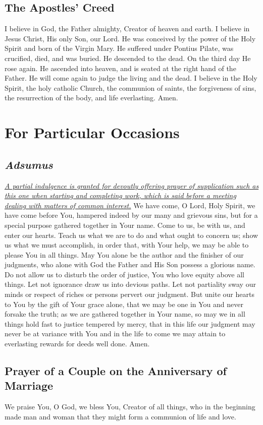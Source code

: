 \documentclass[12pt]{article}
\newcommand{\prayersection}[1]{\section{#1}}
\newcommand{\prayertitle}[1]{\subsection{#1}}
\newcommand{\indulgencedprayertitle}[1]{\prayertitle{#1 \protect\kreuz}}
\newcommand{\foreign}[1]{\textsl{#1}}
\newcommand{\note}[1]{{\small{\textsl{#1}}}\newline}
\newcommand{\linkednote}[2]{\hyperlink{#1}{\note{#2}}}
\begin{document}
\indulgencedprayertitle{The Apostles' Creed}
I believe in God, the Father almighty, Creator of heaven and earth.
I believe in Jesus Christ, His only Son, our Lord.
He was conceived by the power of the Holy Spirit and born of the Virgin Mary.
He suffered under Pontius Pilate, was crucified, died, and was buried.
He descended to the dead.
On the third day He rose again.
He ascended into heaven, and is seated at the right hand of the Father.
He will come again to judge the living and the dead.
I believe in the Holy Spirit, the holy catholic Church, the communion of saints, the forgiveness of sins, the resurrection of the body, and life everlasting.
Amen.

\newpage


\prayersection{For Particular Occasions}
\indulgencedprayertitle{\foreign{Adsumus}}
\linkednote{grant26}{A partial indulgence is granted for devoutly offering prayer of supplication such as this one when starting and completing work, which is said before a meeting dealing with matters of common interest.}
We have come, O Lord, Holy Spirit, we have come before You, hampered indeed by our many and grievous sins, but for a special purpose gathered together in Your name.
Come to us, be with us, and enter our hearts.
Teach us what we are to do and what ought to concern us;
show us what we must accomplish, in order that, with Your help, we may be able to please You in all things.
May You alone be the author and the finisher of our judgments, who alone with God the Father and His Son possess a glorious name.
Do not allow us to disturb the order of justice, You who love equity above all things.
Let not ignorance draw us into devious paths.
Let not partiality sway our minds or respect of riches or persons pervert our judgment.
But unite our hearts to You by the gift of Your grace alone, that we may be one in You and never forsake the truth;
as we are gathered together in Your name, so may we in all things hold fast to justice tempered by mercy, that in this life our judgment may never be at variance with You and in the life to come we may attain to everlasting rewards for deeds well done.
Amen.

\prayertitle{Prayer of a Couple on the Anniversary of Marriage}
We praise You, O God, we bless You, Creator of all things, who in the beginning made man and woman that they might form a communion of life and love.
\end{document}
